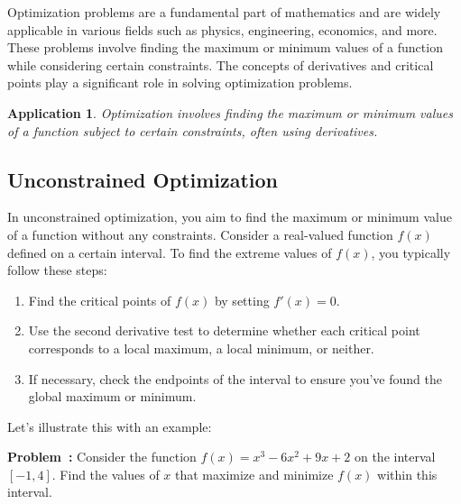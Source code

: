 \documentclass[a4paper,12pt]{book}
\newcounter{problem}
\newenvironment{problem}[1][\theproblem]
{\refstepcounter{problem}\par\medskip\noindent\textbf{Problem~#1:} \rmfamily}{\medskip}
\newcounter{example}
\newtheorem{application}{Application}
\begin{document}
Optimization problems are a fundamental part of mathematics and are widely applicable in various fields such as physics, engineering, economics, and more. These problems involve finding the maximum or minimum values of a function while considering certain constraints. The concepts of derivatives and critical points play a significant role in solving optimization problems.

\begin{application}
Optimization involves finding the maximum or minimum values of a function subject to certain constraints, often using derivatives.
\end{application}

\subsection{Unconstrained Optimization}

In unconstrained optimization, you aim to find the maximum or minimum value of a function without any constraints. Consider a real-valued function \(f(x)\) defined on a certain interval. To find the extreme values of \(f(x)\), you typically follow these steps:

\begin{enumerate}
  \item Find the critical points of \(f(x)\) by setting \(f'(x) = 0\).
  \item Use the second derivative test to determine whether each critical point corresponds to a local maximum, a local minimum, or neither.
  \item If necessary, check the endpoints of the interval to ensure you've found the global maximum or minimum.
\end{enumerate}

Let's illustrate this with an example:

\begin{problem}
Consider the function \(f(x) = x^3 - 6x^2 + 9x + 2\) on the interval \([-1, 4]\). Find the values of \(x\) that maximize and minimize \(f(x)\) within this interval.
\end{problem}
\end{document}
